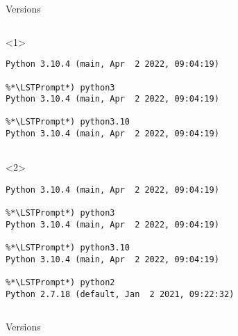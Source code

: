 \begin{frame}[fragile]{Versions}

  \begin{columns}[onlytextwidth]
    \begin{column}{\textwidth}

      \begin{onlyenv}<1>  %
        \begin{lstlisting}[style=sh]
%*\LSTPrompt*) python
Python 3.10.4 (main, Apr  2 2022, 09:04:19)

%*\LSTPrompt*) python3
Python 3.10.4 (main, Apr  2 2022, 09:04:19)

%*\LSTPrompt*) python3.10
Python 3.10.4 (main, Apr  2 2022, 09:04:19)


 \end{lstlisting}
      \end{onlyenv}

      \begin{onlyenv}<2>  %
        \begin{lstlisting}[style=sh]
%*\LSTPrompt*) python
Python 3.10.4 (main, Apr  2 2022, 09:04:19)

%*\LSTPrompt*) python3
Python 3.10.4 (main, Apr  2 2022, 09:04:19)

%*\LSTPrompt*) python3.10
Python 3.10.4 (main, Apr  2 2022, 09:04:19)

%*\LSTPrompt*) python2
Python 2.7.18 (default, Jan  2 2021, 09:22:32) \end{lstlisting}
      \end{onlyenv}

    \end{column}
  \end{columns}
\end{frame}


\begin{frame}[fragile]{Versions}

  \begin{center}


  \vspace*{2cm}


  \end{center}

\end{frame}
